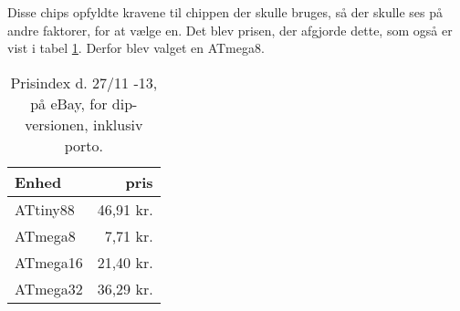 \documentclass[Main]{subfiles}
\begin{document}
Disse chips opfyldte kravene til chippen der skulle bruges, så der skulle ses på andre faktorer, for at vælge en. 
Det blev prisen, der afgjorde dette, som også er vist i tabel \ref{Tab:prisIndex}.
Derfor blev valget en ATmega8.
\begin{table}[H]
\centering
	\begin{tabular}{l r}\hline
	Enhed & pris \\ \hline
	ATtiny88 & 46,91 kr.\\
	ATmega8  & 7,71 kr.\\
	ATmega16 & 21,40 kr.\\
	ATmega32 & 36,29 kr. \\ \hline
	\end{tabular}
\caption{Prisindex d. 27/11 -13, på eBay, for dip-versionen, inklusiv porto.}
\label{Tab:prisIndex}
\end{table}
\end{document}
